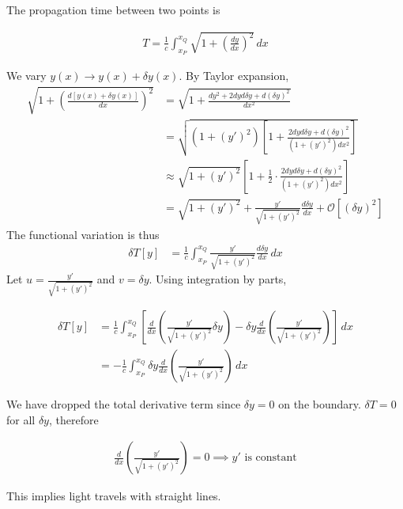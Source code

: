 \documentclass[12pt]{book} %
\numberwithin{equation}{chapter}
\def\d{\delta}
\def\bigO{\mathcal{O}}
\begin{document}
\begin{example}
The propagation time between two points is
\begin{eqnbox}
\begin{align}
T=\frac{1}{c}\int_{x_{P}}^{x_{Q}}\sqrt{1+{\left(\frac{dy}{dx}\right)}^{2}}\,dx
\end{align}
\end{eqnbox}
We vary $y(x)\to y(x)+\d y(x)$. By Taylor expansion,
\begin{align*}
\sqrt{1+{\left(\frac{d[y(x)+\d y(x)]}{dx}\right)}^{2}}&=\sqrt{1+\frac{dy^{2}+2dyd\d y+d(\d y)^{2}}{dx^{2}}}\\
&=\sqrt{\left(1+(y')^{2}\right)\left[1+\frac{2dyd\d y+d(\d y)^{2}}{\left(1+(y')^{2}\right)dx^{2}}\right]}\\
&\approx \sqrt{1+(y')^{2}}\left[1+\frac{1}{2}\cdot \frac{2dyd\d y+d(\d y)^{2}}{\left(1+(y')^{2}\right)dx^{2}}\right]\\
&=\sqrt{1+(y')^{2}}+\frac{y'}{\sqrt{1+(y')^{2}}}\frac{d\d y}{dx}+\bigO[(\d y)^{2}]
\end{align*}
The functional variation is thus
\begin{align*}
\d T[y]&=\frac{1}{c}\int_{x_{P}}^{x_{Q}}\frac{y'}{\sqrt{1+(y')^{2}}}\frac{d\d y}{dx}\,dx
\end{align*}
Let $u=\frac{y'}{\sqrt{1+(y')^{2}}}$ and $v=\d y$. Using integration by parts,
\begin{eqnbox}
\begin{align}
\d T[y]&=\frac{1}{c}\int_{x_{P}}^{x_{Q}}\left[\frac{d}{dx}\left(\frac{y'}{\sqrt{1+(y')^{2}}}\d y\right)-\d y\frac{d}{dx}\left(\frac{y'}{\sqrt{1+(y')^{2}}}\right)\right]\,dx\nonumber\\
&=-\frac{1}{c}\int_{x_{P}}^{x_{Q}}\d y\frac{d}{dx}\left(\frac{y'}{\sqrt{1+(y')^{2}}}\right)\,dx
\end{align}
\end{eqnbox}
We have dropped the total derivative term since $\d y=0$ on the boundary. $\d T=0$ for all $\d y$, therefore
\begin{eqnbox}
\begin{align}
\frac{d}{dx}\left(\frac{y'}{\sqrt{1+(y')^{2}}}\right)=0\implies y'\text{ is constant}
\end{align}
\end{eqnbox}
This implies light travels with straight lines.
\end{example}
\end{document}
